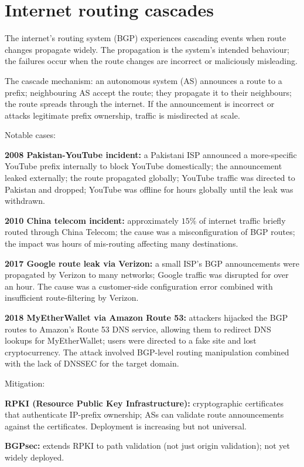 \section{Internet routing cascades}

The internet's routing system (BGP) experiences cascading events when route changes propagate widely. The propagation is the system's intended behaviour; the failures occur when the route changes are incorrect or maliciously misleading.

The cascade mechanism: an autonomous system (AS) announces a route to a prefix; neighbouring AS accept the route; they propagate it to their neighbours; the route spreads through the internet. If the announcement is incorrect or attacks legitimate prefix ownership, traffic is misdirected at scale.

Notable cases:

\textbf{2008 Pakistan-YouTube incident:} a Pakistani ISP announced a more-specific YouTube prefix internally to block YouTube domestically; the announcement leaked externally; the route propagated globally; YouTube traffic was directed to Pakistan and dropped; YouTube was offline for hours globally until the leak was withdrawn.

\textbf{2010 China telecom incident:} approximately $15\%$ of internet traffic briefly routed through China Telecom; the cause was a misconfiguration of BGP routes; the impact was hours of mis-routing affecting many destinations.

\textbf{2017 Google route leak via Verizon:} a small ISP's BGP announcements were propagated by Verizon to many networks; Google traffic was disrupted for over an hour. The cause was a customer-side configuration error combined with insufficient route-filtering by Verizon.

\textbf{2018 MyEtherWallet via Amazon Route 53:} attackers hijacked the BGP routes to Amazon's Route 53 DNS service, allowing them to redirect DNS lookups for MyEtherWallet; users were directed to a fake site and lost cryptocurrency. The attack involved BGP-level routing manipulation combined with the lack of DNSSEC for the target domain.

Mitigation:

\textbf{RPKI (Resource Public Key Infrastructure):} cryptographic certificates that authenticate IP-prefix ownership; ASs can validate route announcements against the certificates. Deployment is increasing but not universal.

\textbf{BGPsec:} extends RPKI to path validation (not just origin validation); not yet widely deployed.

